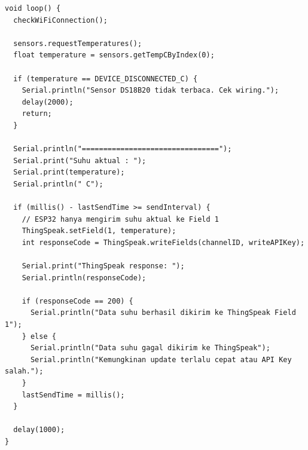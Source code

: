 \begin{lstlisting}[style=cstyle,
    caption={Firmware ESP32-S3 untuk Monitoring Suhu DS18B20 dan Pengiriman ke ThingSpeak},
    label={lst:esp32}]
void loop() {
  checkWiFiConnection();

  sensors.requestTemperatures();
  float temperature = sensors.getTempCByIndex(0);

  if (temperature == DEVICE_DISCONNECTED_C) {
    Serial.println("Sensor DS18B20 tidak terbaca. Cek wiring.");
    delay(2000);
    return;
  }

  Serial.println("================================");
  Serial.print("Suhu aktual : ");
  Serial.print(temperature);
  Serial.println(" C");

  if (millis() - lastSendTime >= sendInterval) {
    // ESP32 hanya mengirim suhu aktual ke Field 1
    ThingSpeak.setField(1, temperature);
    int responseCode = ThingSpeak.writeFields(channelID, writeAPIKey);

    Serial.print("ThingSpeak response: ");
    Serial.println(responseCode);

    if (responseCode == 200) {
      Serial.println("Data suhu berhasil dikirim ke ThingSpeak Field 1");
    } else {
      Serial.println("Data suhu gagal dikirim ke ThingSpeak");
      Serial.println("Kemungkinan update terlalu cepat atau API Key salah.");
    }
    lastSendTime = millis();
  }

  delay(1000);
}
\end{lstlisting}
